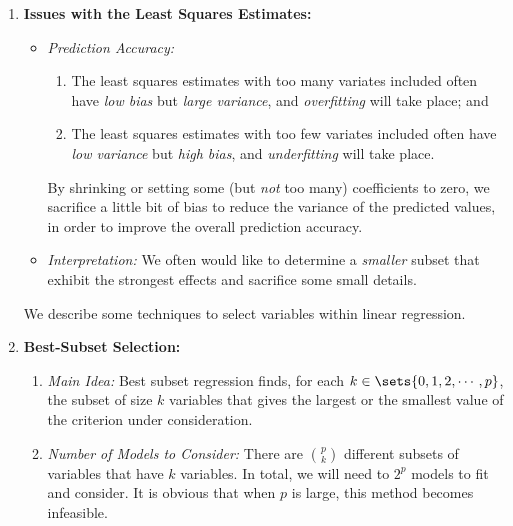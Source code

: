\documentclass[12pt]{article}
\begin{document}
\begin{enumerate}[label=\textbf{\arabic*.}]
	
	\item \textbf{Issues with the Least Squares Estimates:} 
	\begin{itemize}
		\item \textit{Prediction Accuracy:} 
		\begin{enumerate}
			\item The least squares estimates with too many variates included often have \emph{low bias} but \emph{large variance}, and \emph{overfitting} will take place; and 
			\item The least squares estimates with too few variates included often have \emph{low variance} but \emph{high bias}, and \emph{underfitting} will take place. 
		\end{enumerate}
		By shrinking or setting some (but \emph{not} too many) coefficients to zero, we sacrifice a little bit of bias to reduce the variance of the predicted values, in order to improve the overall prediction accuracy. 
		
		\item \textit{Interpretation:} We often would like to determine a \textit{smaller} subset that exhibit the strongest effects and sacrifice some small details. 
	\end{itemize}
	
	We describe some techniques to select variables within linear regression. 
	
	\item \textbf{Best-Subset Selection:} 
	\begin{enumerate}
		\item \textit{Main Idea:} Best subset regression finds, for each $k \in \sets{0, 1, 2, \cdots, p}$, the subset of size $k$ variables that gives the largest or the smallest value of the criterion under consideration. 

		\item \textit{Number of Models to Consider:} There are ${p \choose k}$ different subsets of variables that have $k$ variables. In total, we will need to $2^{p}$ models to fit and consider. It is obvious that when $p$ is large, this method becomes infeasible. 


\end{enumerate}
\end{enumerate}
\end{document}
